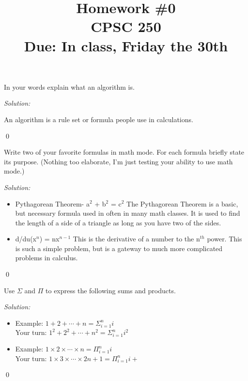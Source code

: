 \documentclass[12pt]{article}
\newenvironment{problem}[2][Problem]{\begin{trivlist}
\item[\hskip \labelsep {\bfseries #1}\hskip \labelsep {\bfseries #2.}]}{\end{trivlist}}
\newenvironment{sol}
    {\emph{Solution:}
    }
    {
    \qed
    }
\begin{document}

\title{Homework \#0 \\ CPSC 250 \\ Due: In class, Friday the 30th}%
\date{}

\maketitle

\begin{problem}{1(1)} 
In your words explain what an algorithm is.
\end{problem}
\begin{sol}
An algorithm is a rule set or formula people use in calculations.
\end{sol}

\begin{problem}{2(1)}
Write two of your favorite formulas in math mode. For each formula 
briefly state its purpose. (Nothing too elaborate, I'm just testing your ability 
to use math mode.)
\end{problem}
\begin{sol}
\begin{itemize}
\item Pythagorean Theorem- a$^2$ + b$^2$ = c$^2$ \newline
  The Pythagorean Theorem is a basic, but necessary formula used in often in many math classes. It is used to find the length of a side of a triangle as long as you have two of the sides.
\item d/du(x$^n$) = nx$^{n-1}$ \newline
  This is the derivative of a number to the n$^{th}$ power. This is such a simple problem, but is a gateway to much more complicated problems in calculus.
\end{itemize}
\end{sol}


\begin{problem}{3(1)}
Use $\Sigma$ and $\Pi$ to express the following sums and products.
\end{problem}
\begin{sol}
\begin{itemize}
\item Example: $1 + 2 + \cdots + n = \Sigma_{i=1}^{n} i$ \\
      Your turn: $1^2 + 2^2 + \cdots + n^2 = \Sigma_{i=1}^{n} i^2$
\item Example: $1 \times 2 \times \cdots \times n = \Pi_{i=1}^{n} i$ \\
      Your turn: $1 \times 3 \times \cdots \times 2n+1 = \Pi_{i=1}^{n} i+$
\end{itemize}
\end{sol}
\end{document}
